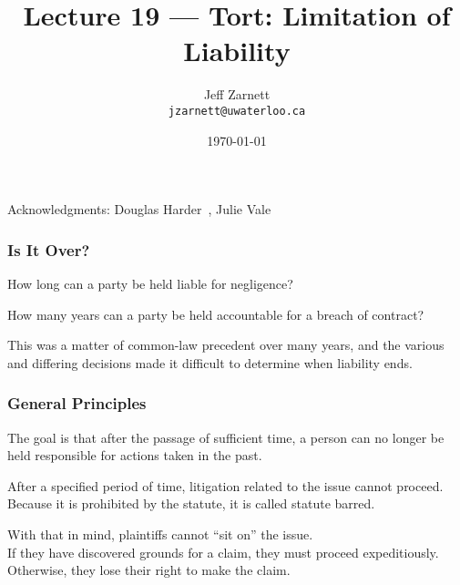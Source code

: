

\title{Lecture 19 --- Tort: Limitation of Liability }

\author{Jeff Zarnett \\ \small \texttt{jzarnett@uwaterloo.ca}}
\date{\today}




\begin{frame}
  \titlepage

\begin{center}
  \small{Acknowledgments: Douglas Harder~\cite{dwh}, Julie Vale~\cite{jv}}
  \end{center}
\end{frame}




\begin{frame}
\frametitle{Is It Over?}

How long can a party be held liable for negligence?

How many years can a party be held accountable for a breach of contract?


This was a matter of common-law precedent over many years, and the various and differing decisions made it difficult to determine when liability ends.

\end{frame}



\begin{frame}
\frametitle{General Principles}

The goal is that after the passage of sufficient time, a person can no longer be held responsible for actions taken in the past. 

After a specified period of time, litigation related to the issue cannot proceed.\\
\quad Because it is prohibited by the statute, it is called \alert{statute barred}.

With that in mind, plaintiffs cannot ``sit on'' the issue.\\
\quad If they have discovered grounds for a claim, they must proceed expeditiously.\\
\quad Otherwise, they lose their right to make the claim.

\end{frame}



